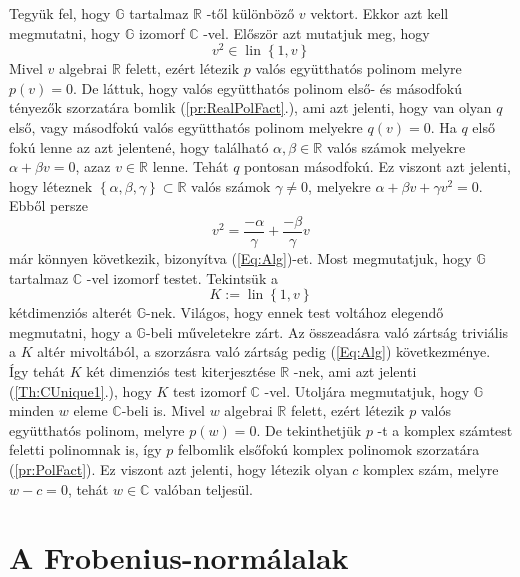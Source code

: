 \documentclass[a4paper, showtrims]{memoir}
\makeatletter
\renewenvironment{proof}[1][\proofname]
    {\par\pushQED{\qed}%
    \normalfont \topsep6\p@\@plus6\p@\relax
    \trivlist
    \item[\hskip\labelsep
        \itshape
    #1\@addpunct{:}]\ignorespaces}
    {\popQED\endtrivlist\@endpefalse}
\theoremstyle{plain}
\theoremstyle{remark}
\theoremstyle{definition}
\DeclareMathOperator{\lin}{lin}
\makeatother
\begin{document}
\begin{proof}
	Tegyük fel, hogy $\mathbb{G}$ tartalmaz $\mathbb{R}$ -től különböző $v$ vektort.
	Ekkor azt kell megmutatni, hogy $\mathbb{G}$ izomorf $\mathbb{C}$ -vel.\newline
	Először azt mutatjuk meg, hogy
	\begin{equation}
		v^{2}\in \lin\left\{ 1,v\right\}
	\end{equation}
	\label{Eq:Alg}Mivel $v$ algebrai $\mathbb{R}$ felett, ezért létezik $p$
	valós együtthatós polinom melyre $p\left( v\right) =0$.
	De láttuk, hogy valós együtthatós polinom első- és másodfokú tényezők szorzatára bomlik (\ref{pr:RealPolFact}.),
	ami azt jelenti, hogy van olyan $q$ első, vagy másodfokú valós együtthatós polinom melyekre $q\left( v\right) =0$.
	Ha $q$ első
	fokú lenne az azt jelentené, hogy található $\alpha ,\beta
		\in \mathbb{R}$ valós számok melyekre $\alpha +\beta v=0$, azaz $v\in \mathbb{R}$ lenne.
	Tehát $q$ pontosan másodfokú.
	Ez viszont azt
	jelenti, hogy léteznek $\left\{ \alpha ,\beta ,\gamma \right\} \subset
		\mathbb{R}$ valós számok $\gamma \neq 0$, melyekre $\alpha +\beta
		v+\gamma v^{2}=0$.
	Ebből persze
	\[
		v^{2}=\frac{-\alpha }{\gamma }+\frac{-\beta }{\gamma }v
	\]
	már könnyen következik, bizonyítva (\ref{Eq:Alg})-et.\newline
	Most megmutatjuk, hogy $\mathbb{G}$ tartalmaz $\mathbb{C}$ -vel izomorf testet.
	Tekintsük a
	\[
		K:=\lin\left\{ 1,v\right\}
	\]
	kétdimenziós alterét $\mathbb{G}$-nek.
	Világos, hogy ennek test
	voltához elegendő megmutatni, hogy a $\mathbb{G}$-beli műveletekre zárt.
	Az összeadásra való zártság triviális a $K$
	altér mivoltából, a szorzásra való zártság pedig
	(\ref{Eq:Alg}) következménye.
	\'{I}gy tehát $K$ két dimenziós test kiterjesztése $\mathbb{R}$ -nek, ami azt jelenti (\ref{Th:CUnique1}.),
	hogy $K$ test izomorf $\mathbb{C}$ -vel.\newline
	Utoljára megmutatjuk, hogy $\mathbb{G}$ minden $w$ eleme $\mathbb{C}$-beli
	is.
	Mivel $w$ algebrai $\mathbb{R}$ felett, ezért létezik $p$ valós együtthatós polinom, melyre $p\left( w\right) =0$.
	De tekinthetjük $p$ -t a komplex számtest feletti polinomnak is, így $p$
	felbomlik elsőfokú komplex polinomok szorzatára (\ref{pr:PolFact}).
	Ez viszont azt jelenti, hogy létezik olyan $c$ komplex szám,
	melyre $w-c=0$, tehát $w\in \mathbb{C}$ valóban teljesül.
\end{proof}

\chapter{A Frobenius-normálalak}
\end{document}
